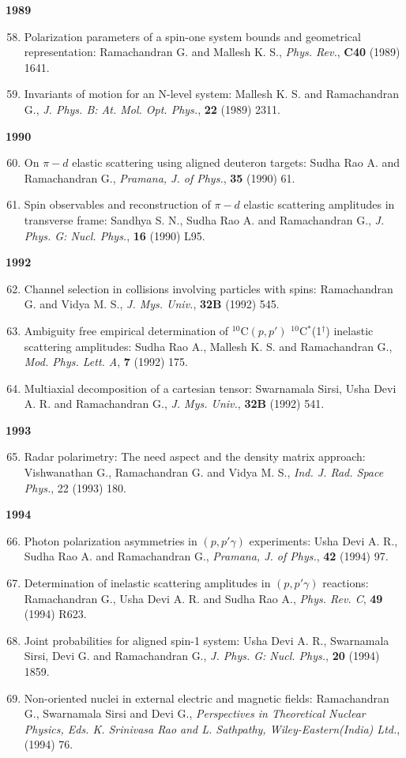 \textbf{1989}
\begin{enumerate}
\setcounter{enumi}{57}
\item Polarization parameters of a spin-one system bounds and geometrical representation: Ramachandran G. and Mallesh K. S., \textit{Phys. Rev.}, {\bf C40} (1989) 1641.
\item Invariants of motion for an N-level system: Mallesh K. S. and Ramachandran G., \textit{J. Phys. B: At. Mol. Opt. Phys.}, {\bf 22} (1989) 2311.
\end{enumerate}
\textbf{1990}
\begin{enumerate}
\setcounter{enumi}{59}
\item On $\pi-d$ elastic scattering using aligned deuteron targets: Sudha Rao A. and Ramachandran G., \textit{Pramana, J. of Phys.}, {\bf 35} (1990) 61.
\item Spin observables and reconstruction of $\pi-d$ elastic scattering amplitudes in transverse frame: Sandhya S. N., Sudha Rao A. and Ramachandran G., \textit{J. Phys. G: Nucl. Phys.}, {\bf 16} (1990) L95.
\end{enumerate}
\textbf{1992}
\begin{enumerate}
\setcounter{enumi}{61}
\item Channel selection in collisions involving particles with spins: Ramachandran G. and Vidya M. S., \textit{J. Mys. Univ.}, {\bf 32B} (1992) 545.
\item Ambiguity free empirical determination of $^{10}$C$(p, p')$ $^{10}$C$^{*}$(1$^{\dagger}$) inelastic scattering amplitudes: Sudha Rao A., Mallesh K. S. and Ramachandran G., \textit{Mod. Phys. Lett. A}, {\bf 7} (1992) 175.
\item Multiaxial decomposition of a cartesian tensor: Swarnamala Sirsi, Usha Devi A. R. and Ramachandran G., \textit{J. Mys. Univ.}, {\bf 32B} (1992) 541.
\end{enumerate}
\textbf{1993}
\begin{enumerate}
\setcounter{enumi}{64}
\item Radar polarimetry: The need aspect and the density matrix approach: Vishwanathan G., Ramachandran G. and Vidya M. S., \textit{Ind. J. Rad. Space Phys.}, 22 (1993) 180.
\end{enumerate}
\textbf{1994}
\begin{enumerate}
\setcounter{enumi}{65}
\item Photon polarization asymmetries in $(p, p'\gamma)$ experiments: Usha Devi A. R., Sudha Rao A. and Ramachandran G., \textit{Pramana, J. of Phys.}, {\bf 42} (1994) 97.
\item Determination of inelastic scattering amplitudes in $(p, p'\gamma)$ reactions: Ramachandran G., Usha Devi A. R. and Sudha Rao A., \textit{Phys. Rev. C}, {\bf 49} (1994) R623.
\item Joint probabilities for aligned spin-1 system: Usha Devi A. R., Swarnamala Sirsi, Devi G. and Ramachandran G., \textit{J. Phys. G: Nucl. Phys.}, {\bf 20} (1994) 1859.
\item Non-oriented nuclei in external electric and magnetic fields: Ramachandran G., Swarnamala Sirsi and Devi G., \textit{Perspectives in Theoretical Nuclear Physics, Eds. K. Srinivasa Rao and L. Sathpathy, Wiley-Eastern(India) Ltd.}, (1994) 76.
\end{enumerate}
